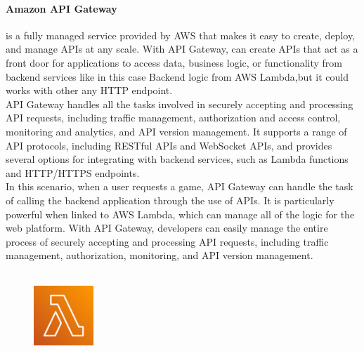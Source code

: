 \documentclass[a4paper,12pt]{report}
\begin{document}
\paragraph{Amazon API Gateway} is a fully managed service provided by AWS that makes it easy to create, deploy, and manage APIs at any scale. With API Gateway, can create APIs that act as a front door for applications to access data, business logic, or functionality from backend services like in this case Backend logic from AWS Lambda,but it could works with other any HTTP endpoint.\\
%
API Gateway handles all the tasks involved in securely accepting and processing API requests, including traffic management, authorization and access control, monitoring and analytics, and API version management. It supports a range of API protocols, including RESTful APIs and WebSocket APIs, and provides several options for integrating with backend services, such as Lambda functions and HTTP/HTTPS endpoints.\\
%
In this scenario,  when a user requests a game, API Gateway can handle the task of calling the backend application through the use of APIs. It is particularly powerful when linked to AWS Lambda, which can manage all of the logic for the web platform. With API Gateway, developers can easily manage the entire process of securely accepting and processing API requests, including traffic management, authorization, monitoring, and API version management. \\\\
%
%
%
\begin{figure}
  \centering
  \includegraphics[width=0.2\textwidth]{img/services/Lambda}
\end{figure}
%
\end{document}
